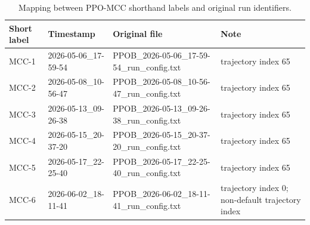 \begin{table}[!t]
\centering
\caption{Mapping between PPO-MCC shorthand labels and original run identifiers.}
\label{tab:mcc_run_key}
\renewcommand{\arraystretch}{1.1}
\scriptsize
\begin{tabular*}{\textwidth}{@{\extracolsep{\fill}}llll}
\toprule
\textbf{Short label} & \textbf{Timestamp} & \textbf{Original file} & \textbf{Note}\\
\midrule
MCC-1 & 2026-05-06\_17-59-54 & PPOB\_2026-05-06\_17-59-54\_run\_config.txt & trajectory index 65\\
MCC-2 & 2026-05-08\_10-56-47 & PPOB\_2026-05-08\_10-56-47\_run\_config.txt & trajectory index 65\\
MCC-3 & 2026-05-13\_09-26-38 & PPOB\_2026-05-13\_09-26-38\_run\_config.txt & trajectory index 65\\
MCC-4 & 2026-05-15\_20-37-20 & PPOB\_2026-05-15\_20-37-20\_run\_config.txt & trajectory index 65\\
MCC-5 & 2026-05-17\_22-25-40 & PPOB\_2026-05-17\_22-25-40\_run\_config.txt & trajectory index 65\\
MCC-6 & 2026-06-02\_18-11-41 & PPOB\_2026-06-02\_18-11-41\_run\_config.txt & trajectory index 0; non-default trajectory index\\
\bottomrule
\end{tabular*}
\end{table}


